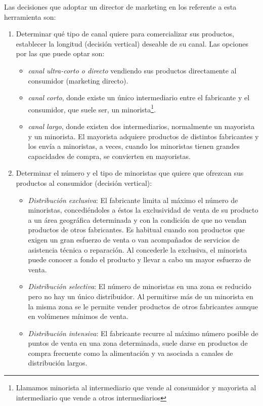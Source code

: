 \documentclass[10pt,a4paper,spanish]{report}
\begin{document}
		Las decisiones que adoptar un director de marketing en los referente a esta  herramienta son:
		\begin{enumerate}
			\item Determinar qué tipo de canal quiere para comercializar sus productos, establecer la longitud (decisión vertical) deseable de su canal. Las opciones por las que puede optar son:
			\begin{itemize} 
				\item \textit{\textcolor[rgb]{0.1,0.2,0.4}{canal ultra-corto o directo}} vendiendo sus productos directamente al consumidor (marketing directo). 
				\item \textit{\textcolor[rgb]{0.1,0.2,0.4}{canal corto}}, donde existe un único intermediario entre el fabricante y el consumidor, que suele ser, un minorista\footnote{Llamamos minorista al intermediario que vende al consumidor y mayorista al intermediario que vende a otros intermediarios}.
				\item \textit{\textcolor[rgb]{0.1,0.2,0.4}{canal largo}},  donde existen dos intermediarios, normalmente un mayorista y un minorista. El mayorista adquiere productos de distintos fabricantes y los envía a minoristas, a veces, cuando los minoristas tienen grandes capacidades de compra, se convierten en mayoristas.
			\end{itemize}
			\item Determinar el número y el tipo de minoristas que quiere que ofrezcan sus productos al consumidor (decisión vertical):
			\begin{itemize}
				\item \textit{\textcolor[rgb]{0.1,0.2,0.4}{Distribución exclusiva}}: El fabricante limita al máximo el número de minoristas, concediéndoles a éstos la exclusividad de venta de su producto a un área geográfica determinada y con la condición de que no vendan productos de otros fabricantes. Es habitual cuando son productos que exigen un gran esfuerzo de venta o van acompañados de servicios de asistencia técnica o reparación. Al concederle la exclusiva, el minorista puede conocer a fondo el producto y llevar a cabo un mayor esfuerzo de venta.
				\item \textit{\textcolor[rgb]{0.1,0.2,0.4}{Distribución selectiva}}: El número de minoristas en una zona es reducido pero no hay un único distribuidor. Al permitirse más de un minorista en la misma zona se le permite vender productos de otros fabricantes aunque en volúmenes mínimos de venta.
				\item \textit{\textcolor[rgb]{0.1,0.2,0.4}{Distribución intensiva}}: El fabricante recurre al máximo número posible de puntos de venta en una zona determinada, suele darse en productos de compra frecuente como la alimentación y va asociada a canales de distribución largos.
			\end{itemize}
		\end{enumerate}
\end{document}
